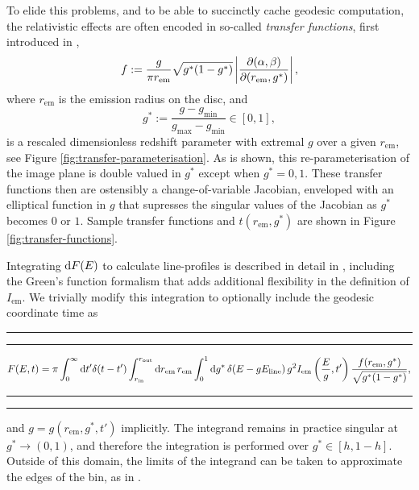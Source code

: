 To elide this problems, and to be able to succinctly cache geodesic computation, the relativistic effects are often encoded in so-called \emph{transfer functions}, first introduced in \cite{cunningham_effects_1975},
\begin{equation}
    f:=\frac{g}{\pi r_\text{em}} \sqrt{g^\ast(1 - g^\ast)} \left\lvert \frac{\partial (\alpha, \beta)}{\partial (r_\text{em}, g^\ast)} \right\rvert,
\end{equation}
where $r_\text{em}$ is the emission radius on the disc, and
\begin{equation}
    g^\ast := \frac{g - g_\text{min}}{g_\text{max} - g_\text{min}} \in [0, 1],
\end{equation}
is a rescaled dimensionless redshift parameter with extremal $g$ over a given $r_\text{em}$, see Figure \ref{fig:transfer-parameterisation}. As is shown, this re-parameterisation of the image plane is double valued in $g^\ast$ except when $g^\ast = 0, 1$. These transfer functions then are ostensibly a change-of-variable Jacobian, enveloped with an elliptical function in $g$ that supresses the singular values of the Jacobian as $g^\ast$ becomes $0$ or $1$. Sample transfer functions and $t(r_\text{em}, g^\ast)$ are shown in Figure \ref{fig:transfer-functions}.

Integrating $\text{d} F(E)$ to calculate line-profiles is described in detail in \cite{dauser_broad_2010}, including the Green's function formalism that adds additional flexibility in the definition of $I_\text{em}$. We trivially modify this integration to optionally include the geodesic coordinate time as

\begin{strip}
\rule[-1ex]{\columnwidth}{0.7pt}\rule[-1ex]{0.7pt}{1.5ex}
\vbox{\vspace{2em}}
\begin{equation}
    F(E, t) =
    \pi
    \int_0^\infty \text{d} t^\prime \delta(t - t^\prime)
    \int_{r_\text{in}}^{r_\text{out}} \text{d} r_\text{em}\,r_\text{em}   
    \int_0^1 \text{d} g^\ast\, \delta(E - gE_\text{line})\, g^2 I_\text{em}\left(\frac{E}{g}, t^\prime\right) \frac{f(r_\text{em}, g^\ast)}{\sqrt{g^\ast (1 - g^\ast)}},
\end{equation}
\vbox{\vspace{2em}}
\hfill\rule[1ex]{0.7pt}{1.5ex}\rule[2.3ex]{\columnwidth}{0.7pt}
\end{strip}
\noindent and $g = g( r_\text{em}, g^\ast, t')$ implicitly. The integrand remains in practice singular at $g^\ast \rightarrow (0, 1)$, and therefore the integration is performed over $g^\ast \in [h, 1 - h]$. Outside of this domain, the limits of the integrand can be taken to approximate the edges of the bin, as in \cite{dauser_broad_2010}.


